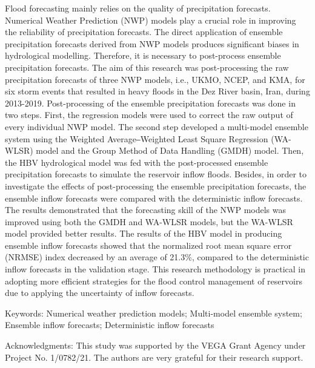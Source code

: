 \noindent

Flood forecasting mainly relies on the quality of precipitation forecasts. Numerical Weather Prediction (NWP) models play a crucial role in improving the reliability of precipitation forecasts. The direct application of ensemble precipitation forecasts derived from NWP models produces significant biases in hydrological modelling. Therefore, it is necessary to post-process ensemble precipitation forecasts. The aim of this research was post-processing the raw precipitation forecasts of three NWP models, i.e., UKMO, NCEP, and KMA, for six storm events that resulted in heavy floods in the Dez River basin, Iran, during 2013-2019. Post-processing of the ensemble precipitation forecasts was done in two steps. First, the regression models were used to correct the raw output of every individual NWP model. The second step developed a multi-model ensemble system using the Weighted Average‒Weighted Least Square Regression (WA-WLSR) model and the Group Method of Data Handling (GMDH) model. Then, the HBV hydrological model was fed with the post-processed ensemble precipitation forecasts to simulate the reservoir inflow floods. Besides, in order to investigate the effects of post-processing the ensemble precipitation forecasts, the ensemble inflow forecasts were compared with the deterministic inflow forecasts. The results demonstrated that the forecasting skill of the NWP models was improved using both the GMDH and WA-WLSR models, but the WA-WLSR model provided better results. The results of the HBV model in producing ensemble inflow forecasts showed that the normalized root mean square error (NRMSE) index decreased by an average of 21.3\%, compared to the deterministic inflow forecasts in the validation stage. This research methodology is practical in adopting more efficient strategies for the flood control management of reservoirs due to applying the uncertainty of inflow forecasts.

Keywords: Numerical weather prediction models; Multi-model ensemble system; Ensemble inflow forecasts; Deterministic inflow forecasts

Acknowledgments: This study was supported by the VEGA Grant Agency under Project No. 1/0782/21. The authors are very grateful for their research support.
\newpage{}
{}
\begin{flushleft}





\end{flushleft}

